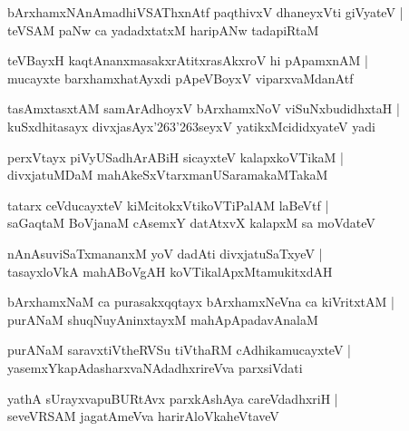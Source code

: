 \documentclass[twoside,12pt,openright]{book}
\def\S{\char'263}
\newcounter{shloka}[chapter]
\begin{document}
\begin{shloka}
bArxhamxNAnAmadhiVSAThxnAtf paqthivxV dhaneyxVti giVyateV |\\
teVSAM paNw ca yadadxtatxM haripANw tadapiRtaM 
\end{shloka}

\begin{shloka}
teVBayxH kaqtAnanxmasakxrAtitxrasAkxroV hi pApamxnAM |\\
mucayxte barxhamxhatAyxdi pApeVBoyxV viparxvaMdanAtf 
\end{shloka}

\begin{shloka}
tasAmxtasxtAM samArAdhoyxV bArxhamxNoV viSuNxbudidhxtaH |\\
kuSxdhitasayx divxjasAyx\S\S seyxV yatikxMcididxyateV yadi
\end{shloka}

\begin{shloka}
perxVtayx piVyUSadhArABiH sicayxteV kalapxkoVTikaM |\\
divxjatuMDaM mahAkeSxVtarxmanUSaramakaMTakaM 
\end{shloka}

\begin{shloka}
tatarx ceVducayxteV kiMcitokxVtikoVTiPalAM laBeVtf |\\
saGaqtaM BoVjanaM cAsemxY datAtxvX kalapxM sa moVdateV 
\end{shloka}

\begin{shloka}
nAnAsuviSaTxmananxM yoV dadAti divxjatuSaTxyeV |\\
tasayxloVkA mahABoVgAH koVTikalApxMtamukitxdAH 
\end{shloka}

\begin{shloka}
bArxhamxNaM ca purasakxqqtayx bArxhamxNeVna ca kiVritxtAM |\\
purANaM shuqNuyAninxtayxM mahApApadavAnalaM 
\end{shloka}

\begin{shloka}
purANaM saravxtiVtheRVSu tiVthaRM cAdhikamucayxteV |\\
yasemxYkapAdasharxvaNAdadhxrireVva parxsiVdati
\end{shloka}

\begin{shloka}
yathA sUrayxvapuBURtAvx parxkAshAya careVdadhxriH |\\
seveVRSAM jagatAmeVva harirAloVkaheVtaveV 
\end{shloka}
\end{document}
